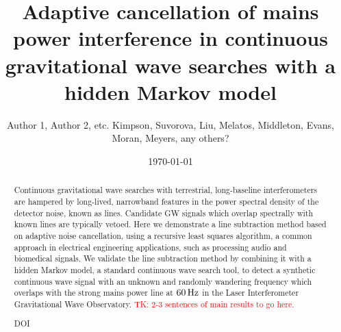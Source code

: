 \documentclass[pra,superscriptaddress,reprint,amsmath,amssymb,nofootinbib]{revtex4-2}
\begin{document}
\preprint{}

\title[test short title]{Adaptive cancellation of mains power interference in continuous gravitational wave searches with a hidden Markov model}%

%

\author{Author 1, Author 2, etc. Kimpson, Suvorova, Liu, Melatos, Middleton, Evans, Moran, Meyers, any others?}
\date{\today}%


\begin{abstract}
		Continuous gravitational wave searches with terrestrial, long-baseline interferometers are hampered by long-lived, narrowband features in the power spectral density of the detector noise, known as lines. Candidate GW signals which overlap spectrally with known lines are typically vetoed. Here we demonstrate a line subtraction method based on adaptive noise cancellation, using a recursive least squares algorithm, a common approach in electrical engineering applications, such as processing audio and biomedical signals. We validate the line subtraction method by combining it with a hidden Markov model, a standard continuous wave search tool, to detect a synthetic continuous wave signal with an unknown and randomly wandering frequency which overlaps with the strong mains power line at $60 \, {\rm Hz}$ in the Laser Interferometer Gravitational Wave Observatory. \textcolor{red}{TK: 2-3 sentences of main results to go here.}
\begin{description}
\item[DOI]
\end{description}
\end{abstract}



\maketitle	
\end{document}
